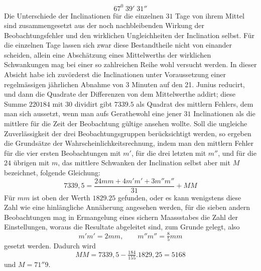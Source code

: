 \[
67^0\;39'\;31''
\]
Die Unterschiede der Inclinationen für die einzelnen $31$ Tage von ihrem Mittel sind zusammengesetzt aus der noch nachbleibenden Wirkung der Beobachtungsfehler und den wirklichen Ungleichheiten der Inclination selbst. Für die
einzelnen Tage lassen sich zwar diese Bestandtheile nicht von einander scheiden, allein eine Abschätzung eines Mittelwerths der wirklichen Schwankungen mag bei einer so zahlreichen Reihe wohl versucht werden. In dieser Absicht habe ich zuvörderst die Inclinationen unter Voraussetzung einer regelmässigen jährlichen Abnahme von $3$ Minuten auf den 21. Junius reducirt, und dann die Quadrate der Differenzen von dem Mittelwerthe addirt; diese Summe $220184$ mit $30$ dividirt gibt $7339.5$ als Quadrat des mittlern Fehlers, dem man sich aussetzt, wenn man aufs Gerathewohl eine jener $31$ Inclinationen als die mittlere für die Zeit der Beobachtung gültige ansehen wollte. Soll die ungleiche Zuverlässigkeit der drei Beobachtungsgruppen berücksichtigt werden, so ergeben die Grundsätze der Wahrscheinlichkeitsrechnung, indem man den mittlern Fehler für die vier ersten Beobachtungen mit $m'$, für die drei letzten mit $m''$, und für die $24$ übrigen mit $m$, das mittlere Schwanken der Inclination selbst aber mit $M$ bezeichnet, folgende Gleichung:
\[
7339{,}5=\frac{24mm+4m'm'+3m''m''}{31}+MM
\]
Für $mm$ ist oben der Werth $1829.25$ gefunden, oder es kann wenigstens diese Zahl wie eine hinlängliche Annäherung angesehen werden, für die sieben andern Beobachtungen mag in Ermangelung eines sichern Maassstabes die Zahl der Einstellungen, woraus die Resultate abgeleitet sind, zum Grunde gelegt, also
\[
m'm'=2mm,\qquad m''m''=\tfrac85mm
\]
gesetzt werden. Dadurch wird
\[
MM=7339{,}5-\tfrac{184}{155}.1829{,}25=5168
\]
und $M=71''9$.

